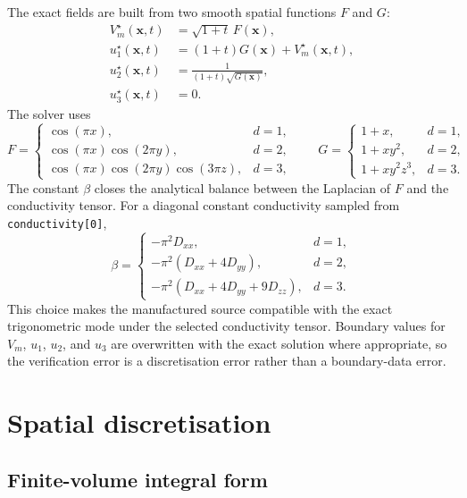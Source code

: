 \documentclass[11pt,a4paper]{article}
\newcommand{\code}[1]{\texttt{\small #1}}
\newcommand{\Vm}{V_m}
\begin{document}
The exact fields are built from two smooth spatial functions $F$ and $G$:
\begin{align}
  \Vm^\star(\mathbf{x},t) &= \sqrt{1+t}\,F(\mathbf{x}),\\
  u_1^\star(\mathbf{x},t) &= (1+t)G(\mathbf{x})+\Vm^\star(\mathbf{x},t),\\
  u_2^\star(\mathbf{x},t) &= \frac{1}{(1+t)\sqrt{G(\mathbf{x})}},\\
  u_3^\star(\mathbf{x},t) &= 0.
\end{align}
The solver uses
\begin{equation}
F =
\begin{cases}
\cos(\pi x), & d=1,\\
\cos(\pi x)\cos(2\pi y), & d=2,\\
\cos(\pi x)\cos(2\pi y)\cos(3\pi z), & d=3,
\end{cases}
\qquad
G =
\begin{cases}
1+x, & d=1,\\
1+x y^2, & d=2,\\
1+x y^2 z^3, & d=3.
\end{cases}
\end{equation}
The constant $\beta$ closes the analytical balance between the Laplacian of
$F$ and the conductivity tensor. For a diagonal constant conductivity sampled
from \code{conductivity[0]},
\begin{equation}
  \beta =
  \begin{cases}
    -\pi^2 D_{xx}, & d=1,\\
    -\pi^2(D_{xx}+4D_{yy}), & d=2,\\
    -\pi^2(D_{xx}+4D_{yy}+9D_{zz}), & d=3.
  \end{cases}
\end{equation}
This choice makes the manufactured source compatible with the exact
trigonometric mode under the selected conductivity tensor. Boundary values for
$\Vm$, $u_1$, $u_2$, and $u_3$ are overwritten with the exact solution where
appropriate, so the verification error is a discretisation error rather than a
boundary-data error.

\section{Spatial discretisation}

\subsection{Finite-volume integral form}
\end{document}
